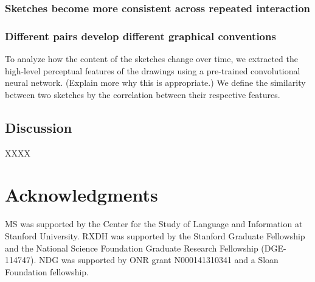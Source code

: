 \documentclass[10pt,letterpaper]{article}
\begin{document}
\subsubsection{Sketches become more consistent across repeated interaction}

\subsubsection{Different pairs develop different graphical conventions} 
To analyze how the content of the sketches change over time, we extracted the high-level perceptual features of the drawings using a pre-trained convolutional neural network. 
(Explain more why this is appropriate.) 
We define the similarity between two sketches by the correlation between their respective features.

 


\subsection{Discussion}

XXXX

\section{\bf Acknowledgments}
\small
MS was supported by the Center for the Study of Language and Information at Stanford University. RXDH was supported by the Stanford Graduate Fellowship and the National Science Foundation Graduate Research Fellowship (DGE-114747). NDG was supported by ONR grant N000141310341 and a Sloan Foundation fellowship.


\setlength{\bibleftmargin}{.125in}
\setlength{\bibindent}{-\bibleftmargin}


\end{document}
